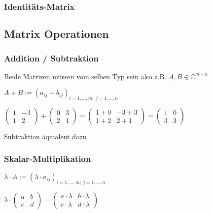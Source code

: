 \documentclass[10pt,a4paper]{article}
\begin{document}
\subsubsection{Identitäts-Matrix}



\subsection{Matrix Operationen}

\subsubsection*{Addition / Subtraktion}

Beide Matrizen müssen vom selben Typ sein also z.B. $A,B \in \mathbb{C}^{m\times n}$

$ A+B := (a_{ij}+b_{ij})_{i=1 , \ldots , m; \ j=1 , \ldots , n} $


$\begin{pmatrix} 1 & -3  \\ 1 & 2  \end{pmatrix} 
+ \begin{pmatrix} 0 & 3  \\ 2 & 1 \end{pmatrix} 
= \begin{pmatrix} 1+0 & -3+3  \\ 1+2 & 2+1  \end{pmatrix} 
= \begin{pmatrix} 1 & 0  \\ 3 & 3  \end{pmatrix} 
$

Subtraktion äquialent dazu

\subsubsection*{Skalar-Multiplikation}


$\lambda\cdot A := (\lambda\cdot a_{ij})_{i=1, \ldots , m; \ j=1, \ldots , n}$

$\lambda\cdot \begin{pmatrix} a & b  \\ c & d  \end{pmatrix} = 
\begin{pmatrix} a \cdot\lambda & b\cdot\lambda  \\ c\cdot\lambda & d\cdot\lambda  \end{pmatrix} $
\end{document}
